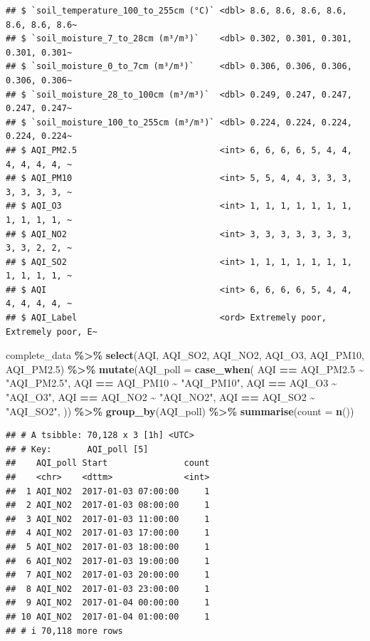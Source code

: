 \documentclass[
]{article}
\newenvironment{Shaded}{\begin{snugshade}}{\end{snugshade}}
\newcommand{\AttributeTok}[1]{\textcolor[rgb]{0.13,0.29,0.53}{#1}}
\newcommand{\FloatTok}[1]{\textcolor[rgb]{0.00,0.00,0.81}{#1}}
\newcommand{\FunctionTok}[1]{\textcolor[rgb]{0.13,0.29,0.53}{\textbf{#1}}}
\newcommand{\NormalTok}[1]{#1}
\newcommand{\SpecialCharTok}[1]{\textcolor[rgb]{0.81,0.36,0.00}{\textbf{#1}}}
\newcommand{\StringTok}[1]{\textcolor[rgb]{0.31,0.60,0.02}{#1}}
\begin{document}
\begin{verbatim}
## $ `soil_temperature_100_to_255cm (°C)` <dbl> 8.6, 8.6, 8.6, 8.6, 8.6, 8.6, 8.6~
## $ `soil_moisture_7_to_28cm (m³/m³)`    <dbl> 0.302, 0.301, 0.301, 0.301, 0.301~
## $ `soil_moisture_0_to_7cm (m³/m³)`     <dbl> 0.306, 0.306, 0.306, 0.306, 0.306~
## $ `soil_moisture_28_to_100cm (m³/m³)`  <dbl> 0.249, 0.247, 0.247, 0.247, 0.247~
## $ `soil_moisture_100_to_255cm (m³/m³)` <dbl> 0.224, 0.224, 0.224, 0.224, 0.224~
## $ AQI_PM2.5                            <int> 6, 6, 6, 6, 5, 4, 4, 4, 4, 4, 4, ~
## $ AQI_PM10                             <int> 5, 5, 4, 4, 3, 3, 3, 3, 3, 3, 3, ~
## $ AQI_O3                               <int> 1, 1, 1, 1, 1, 1, 1, 1, 1, 1, 1, ~
## $ AQI_NO2                              <int> 3, 3, 3, 3, 3, 3, 3, 3, 3, 2, 2, ~
## $ AQI_SO2                              <int> 1, 1, 1, 1, 1, 1, 1, 1, 1, 1, 1, ~
## $ AQI                                  <int> 6, 6, 6, 6, 5, 4, 4, 4, 4, 4, 4, ~
## $ AQI_Label                            <ord> Extremely poor, Extremely poor, E~
\end{verbatim}

\begin{Shaded}
\begin{Highlighting}[]
\NormalTok{complete\_data }\SpecialCharTok{\%\textgreater{}\%} 
  \FunctionTok{select}\NormalTok{(AQI, AQI\_SO2, AQI\_NO2, AQI\_O3, AQI\_PM10, AQI\_PM2}\FloatTok{.5}\NormalTok{) }\SpecialCharTok{\%\textgreater{}\%}
  \FunctionTok{mutate}\NormalTok{(}\AttributeTok{AQI\_poll =} \FunctionTok{case\_when}\NormalTok{(}
\NormalTok{    AQI }\SpecialCharTok{==}\NormalTok{ AQI\_PM2}\FloatTok{.5} \SpecialCharTok{\textasciitilde{}} \StringTok{"AQI\_PM2.5"}\NormalTok{,}
\NormalTok{    AQI }\SpecialCharTok{==}\NormalTok{ AQI\_PM10 }\SpecialCharTok{\textasciitilde{}} \StringTok{"AQI\_PM10"}\NormalTok{,}
\NormalTok{    AQI }\SpecialCharTok{==}\NormalTok{ AQI\_O3 }\SpecialCharTok{\textasciitilde{}} \StringTok{"AQI\_O3"}\NormalTok{,}
\NormalTok{    AQI }\SpecialCharTok{==}\NormalTok{ AQI\_NO2 }\SpecialCharTok{\textasciitilde{}} \StringTok{"AQI\_NO2"}\NormalTok{,}
\NormalTok{    AQI }\SpecialCharTok{==}\NormalTok{ AQI\_SO2 }\SpecialCharTok{\textasciitilde{}} \StringTok{"AQI\_SO2"}\NormalTok{,}
\NormalTok{  )) }\SpecialCharTok{\%\textgreater{}\%}
  \FunctionTok{group\_by}\NormalTok{(AQI\_poll) }\SpecialCharTok{\%\textgreater{}\%}
  \FunctionTok{summarise}\NormalTok{(}\AttributeTok{count =} \FunctionTok{n}\NormalTok{())}
\end{Highlighting}
\end{Shaded}

\begin{verbatim}
## # A tsibble: 70,128 x 3 [1h] <UTC>
## # Key:       AQI_poll [5]
##    AQI_poll Start               count
##    <chr>    <dttm>              <int>
##  1 AQI_NO2  2017-01-03 07:00:00     1
##  2 AQI_NO2  2017-01-03 08:00:00     1
##  3 AQI_NO2  2017-01-03 11:00:00     1
##  4 AQI_NO2  2017-01-03 17:00:00     1
##  5 AQI_NO2  2017-01-03 18:00:00     1
##  6 AQI_NO2  2017-01-03 19:00:00     1
##  7 AQI_NO2  2017-01-03 20:00:00     1
##  8 AQI_NO2  2017-01-03 23:00:00     1
##  9 AQI_NO2  2017-01-04 00:00:00     1
## 10 AQI_NO2  2017-01-04 01:00:00     1
## # i 70,118 more rows
\end{verbatim}
\end{document}
